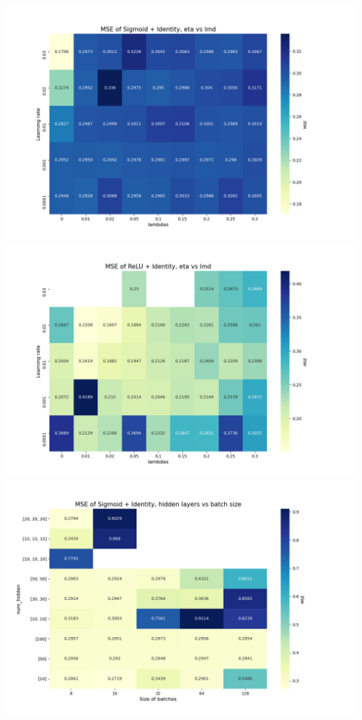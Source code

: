 \documentclass[12pt, letterpaper, twoside]{article}
\begin{document}
\includegraphics[scale=0.5]{"eta_v_lmd_sigmoid"}\\
\includegraphics[scale=0.5]{"eta_v_lmd_relu"}\\
\includegraphics[scale=0.5]{"layer_v_batch_sigmoid"}\\
\end{document}
